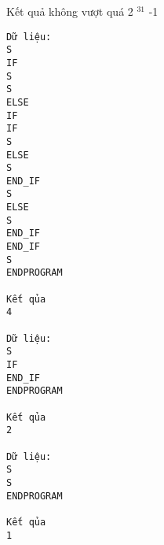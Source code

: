 Kết quả không vượt quá 2   $^    31   $   -1
\begin{verbatim}
Dữ liệu:
S
IF
S
S
ELSE
IF
IF
S
ELSE
S
END_IF
S
ELSE
S
END_IF
END_IF
S
ENDPROGRAM

Kết qủa
4

Dữ liệu:
S
IF
END_IF
ENDPROGRAM

Kết qủa
2

Dữ liệu:
S
S
ENDPROGRAM

Kết qủa
1
\end{verbatim}